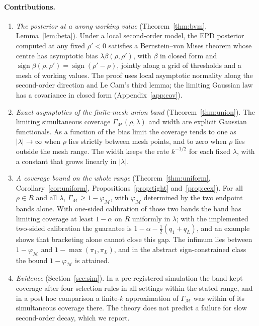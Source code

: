 \documentclass[11pt]{article}
\theoremstyle{definition}
\theoremstyle{remark}
\numberwithin{equation}{section}
\newcommand{\Mesh}{\mathcal{M}}
\begin{document}
\paragraph{Contributions.}
\begin{enumerate}
\item \emph{The posterior at a wrong working value} (Theorem~\ref{thm:bvm}, Lemma~\ref{lem:beta}). Under a local second-order model, the EPD posterior computed at any fixed $\rho'<0$ satisfies a Bernstein--von Mises theorem whose centre has asymptotic bias $\lambda\beta(\rho,\rho')$, with $\beta$ in closed form and $\operatorname{sign}\beta(\rho,\rho')=\operatorname{sign}(\rho'-\rho)$, jointly along a grid of thresholds and a mesh of working values. The proof uses local asymptotic normality along the second-order direction and Le Cam's third lemma; the limiting Gaussian law has a covariance in closed form (Appendix~\ref{app:cov}).
\item \emph{Exact asymptotics of the finite-mesh union band} (Theorem~\ref{thm:union}). The limiting simultaneous coverage $\Gamma_\Mesh(\rho,\lambda)$ and width are explicit Gaussian functionals. As a function of the bias limit the coverage tends to one as $|\lambda|\to\infty$ when $\rho$ lies strictly between mesh points, and to zero when $\rho$ lies outside the mesh range. The width keeps the rate $k^{-1/2}$ for each fixed $\lambda$, with a constant that grows linearly in $|\lambda|$.
\item \emph{A coverage bound on the whole range} (Theorem~\ref{thm:uniform}, Corollary~\ref{cor:uniform}, Propositions~\ref{prop:tight} and~\ref{prop:cex}). For all $\rho\in R$ and all $\lambda$, $\Gamma_\Mesh\ge1-\varphi_\Mesh$, with $\varphi_\Mesh$ determined by the two endpoint bands alone. With one-sided calibration of those two bands the band has limiting coverage at least $1-\alpha$ on $R$ uniformly in $\lambda$; with the implemented two-sided calibration the guarantee is $1-\alpha-\tfrac12(q_1+q_L)$, and an example shows that bracketing alone cannot close this gap. The infimum lies between $1-\varphi_\Mesh$ and $1-\max(\pi_1,\pi_L)$, and in the abstract sign-constrained class the bound $1-\varphi_\Mesh$ is attained.
\item \emph{Evidence} (Section~\ref{sec:sim}). In a pre-registered simulation the band kept coverage after four selection rules in all \nCellsIn{} settings within the stated range, and in a post hoc comparison a finite-$k$ approximation of $\Gamma_\Mesh$ was within \diffAbsMax{} of its simultaneous coverage there. The theory does not predict a failure for slow second-order decay, which we report.
\end{enumerate}
\end{document}
